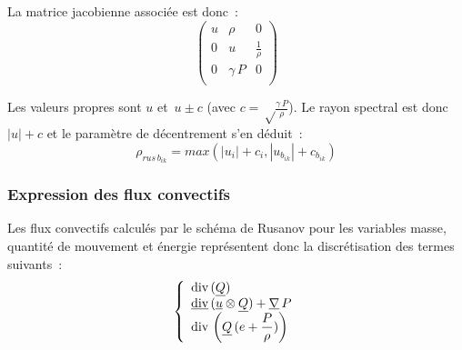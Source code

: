 La matrice jacobienne associée est donc~:
\begin{equation}
\left(\begin{array}{lll}
\displaystyle u & \rho                 & 0                                \\
\displaystyle 0 & u                    & \displaystyle\frac{1}{\rho}        \\
\displaystyle 0 & \gamma\, P        & 0                                 \\
\end{array}\right)
\end{equation}

Les valeurs propres sont $u$ et $\displaystyle\,u\pm c$ (avec
$c=\sqrt\frac{\gamma\,P}{\rho}$). Le rayon spectral est donc
$|u|+c$ et le paramètre de décentrement s'en déduit~:
\begin{equation}
\rho_{rus\,{b}_{ik}} = max\left(|u_i|+c_i,|u_{{b}_{ik}}|+c_{{b}_{ik}}\right)
\end{equation}


\subsubsection*{Expression des flux convectifs}

Les flux convectifs calculés par le schéma de Rusanov
pour les variables masse, quantité de mouvement
et énergie représentent donc la discrétisation des termes suivants~:
\begin{equation}
\left\{\begin{array}{l}
\displaystyle\text{div}\,(\underline{Q})\\
\displaystyle\underline{\text{div}}\,(\underline{u}\otimes\underline{Q})+\underline{\nabla}\,P\\
\displaystyle\text{div}\,\left(\underline{Q}\,(e+\frac{P}{\rho})\right)
\end{array}\right.
\end{equation}

